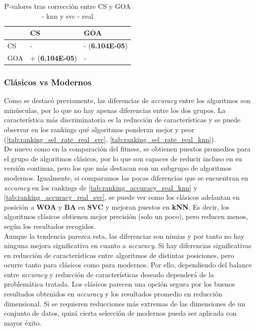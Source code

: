 \begin{table}
    \centering
    \begin{tabular}{lll}
        \toprule
        {}  & CS                     & GOA                    \\
        \midrule
        CS  & -                      & - (\textbf{6.104E-05}) \\
        GOA & + (\textbf{6.104E-05}) & -                      \\
        \bottomrule
    \end{tabular}
    \caption{P-valores tras corrección entre CS y GOA - knn y svc - real}
    \label{tab:pval_corr_best-worst-real_svc_knn}
\end{table}

\subsubsection{Clásicos vs Modernos}
Como se destacó previamente, las diferencias de \textit{accuracy} entre los algoritmos son minúsculas, por lo que no hay apenas diferencias entre los dos grupos. La característica más discriminatoria es la reducción de características y se puede observar en los rankings qué algoritmos ponderan mejor y peor (\ref{tab:ranking_sel_rate_real_svc}, \ref{tab:ranking_sel_rate_real_knn}).\\[6pt]
De nuevo como en la comparación del fitness, se obtienen puestos promedios para el grupo de algoritmos clásicos, por lo que son capaces de reducir incluso en su versión continua, pero los que más destacan son un subgrupo de algoritmos modernos. Igualmente, si comparamos las pocas diferencias que se encuentran en \textit{accuracy} en los rankings de \ref{tab:ranking_accuracy_real_knn} y \ref{tab:ranking_accuracy_real_svc}, se puede ver como los clásicos adelantan en posición a \textbf{WOA} y \textbf{BA} en \textbf{SVC} y mejoran puestos en \textbf{kNN}. Es decir, los algoritmos clásicos obtienen mejor precisión (solo un poco), pero reducen menos, según los resultados recogidos.\\[6pt]
Aunque la tendencia parezca esta, las diferencias son nimias y por tanto no hay ninguna mejora significativa en cuanto a \textit{accuracy}. Si hay diferencias significativas en reducción de características entre algoritmos de distintas posiciones, pero ocurre tanto para clásicos como para modernos. Por ello, dependiendo del balance entre \textit{accuracy} y reducción de características  deseado dependerá de la problemática tratada. Los clásicos parecen una opción segura por los buenos resultados obtenidos en \textit{accuracy} y los resultados promedio en reducción dimensional. Si se requieren reducciones más extremas de las dimensiones de un conjunto de datos, quizá cierta selección de modernos pueda ser aplicada con mayor éxito.

